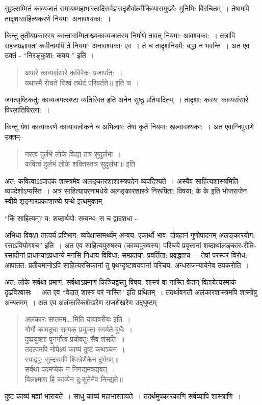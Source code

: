 {सुहृत्सम्मितं काव्यजातं रामायण्महाभारतादिसर्वज्ञसदृशैर्वाल्मीकिव्यासमुख्यै: मुनिभि: विरचितम्~। तेषामपि तादृशासाहित्यकरणे नियमा: अनावश्यका:~। 

किन्तु तृतीयप्रकारस्य कान्तासम्मिताख्यकाव्यजातस्य निर्माणे तावत् नियमा: आवश्यका:~। तत्रापि सहजप्रज्ञावतां कवीनामपि ते नियमा: अनावश्यका: एव~। ते च तादृशनियमै: बद्धा न भवन्ति~।  अत एव उक्तं - “निरङ्कुशा: कवय:” इति~। 
\begin{verse}
अपारे काव्यसंसारे कविरेक: प्रजापति:~। \\
यथास्मै रोचते विश्वं तथेदं परिवर्तते॥ इति च~। 
\end{verse}
जगत्सृष्टिकर्तु: काव्यजगत्स्रष्टा व्यतिरिक्त इति अनेन सुष्ठु प्रतिपादितम्~। तादृशा: कवय: काव्यसंसारे विरलातिविरला:~। 

किन्तु येषां काव्यकरणे काव्यावलोकने च अभिलाष: तेषां कृते नियमा: खल्वावश्यका:~। अत एवाग्निपुराणे उक्तम्-
\begin{verse}
नरत्वं दुर्लभे लोके विद्या तत्र सुदुर्लभा~। \\
कवित्वं दुर्लभं लोके शक्तिस्तत्र सुदुर्लभा॥ इति
\end{verse}
अत: कवित्वाऽऽपादकं शास्त्रमेव अलङ्कारशाशास्त्रपदेन व्यपदिश्यते~। अस्यैव साहित्यशास्त्रमिति व्यपदेशोऽप्यस्ति~। अत्र साहित्यापरनामधेये अलङ्कारशास्त्रे निरूपिता: विषया: के के इति भोजराजेन स्वीये शृङ्गारप्रकाशाख्ये ग्रन्थे इत्थमुक्तम्-

“किं साहित्यम्? य: शब्दार्थयोः सम्बन्ध: स च द्वादशधा -

अभिधा विवक्षा तात्पर्यं प्रविभाग: व्यपेक्षासामर्थ्यम् अन्वय: एकार्थो भाव: दोषहानं गुणोपादनम् अलङ्कारयोग: रसाऽवियोगश्च” इति~। अत एव साहित्यपुरुषस्य (काव्यपुरुषस्य) परिचये प्रवृत्तानां शब्दार्थालङ्कार-रीति-रसादीनां प्राधान्याऽप्रधान्ये मनसि निधाय विविधा: सम्प्रदाया: प्रवर्तिता: प्रवृद्धाश्च~। तेषां परस्परं विरोध: आपातत: प्रतीयमानोऽपि साहित्यरसिकानां तु पृथग्दृष्टावयवानां  परिचय: अन्धराजन्यायेनेव उपकरोति~। 

अत: लोके सर्वथा प्रमाणं, सर्वथाऽप्रमाणं किञ्चिद्वस्तु विषय: शास्त्रं वा नास्ति वेदान् विहायेत्यस्माकं दृढविश्वासः~। अत एव “वेदात् शास्त्रं परं नास्ति” इति प्रथितम्~। तदर्थावगतौ अलंकारशास्त्रमपि शास्त्रेषु अन्यतमम्~। अत एव अलंकारिकशेखरेण राजशेखरेण उद्घुष्टम् 
\begin{verse}
अलंकारः सप्तमम….मिति यायावरीयः इति~। \\
गौर्गौ कामदुघा सम्यक् प्रयुक्ता स्मर्यते बुधैः~। \\
दुष्प्रयुक्ता पुनर्गोत्वं प्रयोक्तुः सैव शंसति~॥\\
तदल्पमपि नोपेक्ष्यं काव्यं दुष्टं कथञ्चन~। \\
स्याद्वपु: सुन्दरमपि श्वित्रेणैकेन दुर्भगम्॥\\
सर्वथा पदमप्येकं न निगद्यमवद्यवत्~। \\
विलक्ष्मणा हि काव्येन दु:सुतेनेव निन्द्यते॥
\end{verse}
दुष्टं काव्यं मह्यां भारायते~। साधु काव्यं महाभारतायते~। तदर्थमुपकारकाणि सर्वव्यापि शास्त्राणि~। 

}
